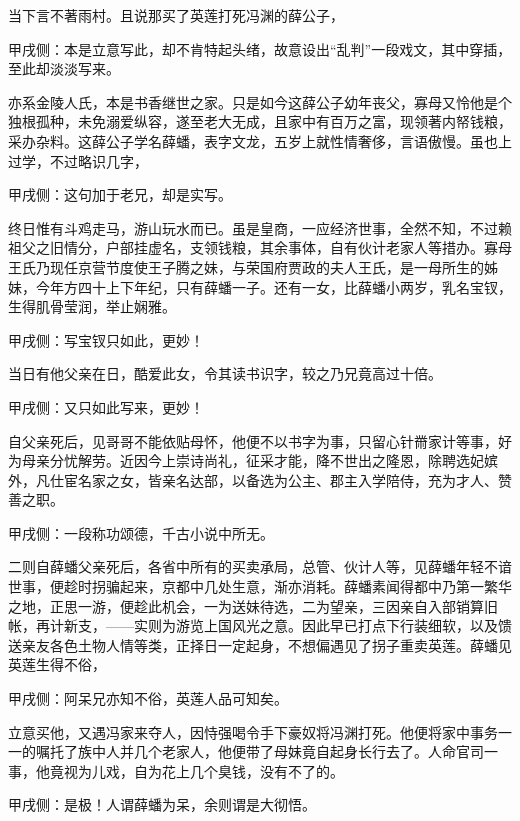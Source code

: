 \begin{parag}
    当下言不著雨村。且说那买了英莲打死冯渊的薛公子，\begin{note}甲戌侧：本是立意写此，却不肯特起头绪，故意设出“乱判”一段戏文，其中穿插，至此却淡淡写来。\end{note}亦系金陵人氏，本是书香继世之家。只是如今这薛公子幼年丧父，寡母又怜他是个独根孤种，未免溺爱纵容，遂至老大无成，且家中有百万之富，现领著内帑钱粮，采办杂料。这薛公子学名薛蟠，表字文龙，五岁上就性情奢侈，言语傲慢。虽也上过学，不过略识几字，\begin{note}甲戌侧：这句加于老兄，却是实写。\end{note}终日惟有斗鸡走马，游山玩水而已。虽是皇商，一应经济世事，全然不知，不过赖祖父之旧情分，户部挂虚名，支领钱粮，其余事体，自有伙计老家人等措办。寡母王氏乃现任京营节度使王子腾之妹，与荣国府贾政的夫人王氏，是一母所生的姊妹，今年方四十上下年纪，只有薛蟠一子。还有一女，比薛蟠小两岁，乳名宝钗，生得肌骨莹润，举止娴雅。\begin{note}甲戌侧：写宝钗只如此，更妙！\end{note}当日有他父亲在日，酷爱此女，令其读书识字，较之乃兄竟高过十倍。\begin{note}甲戌侧：又只如此写来，更妙！\end{note}自父亲死后，见哥哥不能依贴母怀，他便不以书字为事，只留心针黹家计等事，好为母亲分忧解劳。近因今上崇诗尚礼，征采才能，降不世出之隆恩，除聘选妃嫔外，凡仕宦名家之女，皆亲名达部，以备选为公主、郡主入学陪侍，充为才人、赞善之职。\begin{note}甲戌侧：一段称功颂德，千古小说中所无。\end{note}二则自薛蟠父亲死后，各省中所有的买卖承局，总管、伙计人等，见薛蟠年轻不谙世事，便趁时拐骗起来，京都中几处生意，渐亦消耗。薛蟠素闻得都中乃第一繁华之地，正思一游，便趁此机会，一为送妹待选，二为望亲，三因亲自入部销算旧帐，再计新支，——实则为游览上国风光之意。因此早已打点下行装细软，以及馈送亲友各色土物人情等类，正择日一定起身，不想偏遇见了拐子重卖英莲。薛蟠见英莲生得不俗，\begin{note}甲戌侧：阿呆兄亦知不俗，英莲人品可知矣。\end{note}立意买他，又遇冯家来夺人，因恃强喝令手下豪奴将冯渊打死。他便将家中事务一一的嘱托了族中人并几个老家人，他便带了母妹竟自起身长行去了。人命官司一事，他竟视为儿戏，自为花上几个臭钱，没有不了的。\begin{note}甲戌侧：是极！人谓薛蟠为呆，余则谓是大彻悟。\end{note}
\end{parag}


